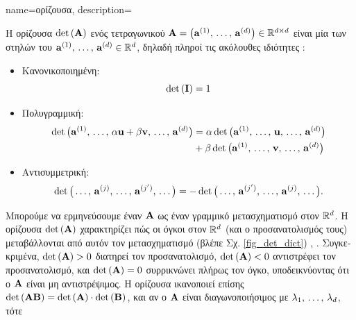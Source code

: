 {name={\foreignlanguage{greek}{ορίζουσα}},
	description={\foreignlanguage{greek}{Η ορίζουσα} $\det\,({\bf A})$ \foreignlanguage{greek}{ενός τετραγωνικού}
		 $\mA =\linebreak \big( \va^{(1)},\,\ldots,\,\va^{(\nrfeatures)} \big) \in \mathbb{R}^{\nrfeatures \times \nrfeatures}$ 
		\foreignlanguage{greek}{είναι μία}  \foreignlanguage{greek}{των στηλών του\linebreak 
		${\bf a}^{(1)},\,\ldots,\,{\bf a}^{(d)} \in \mathbb{R}^{d}$, δηλαδή πληροί τις ακόλουθες ιδιότητες} \cite{DirschmidHansJorg1996TuF}:
		\begin{itemize}
			\item \foreignlanguage{greek}{Κανονικοποιημένη}: $$\det\,(\mathbf{I}) = 1$$ 
			\item \foreignlanguage{greek}{Πολυγραμμική}: \begin{align} \nonumber \det \big({\bf a}^{(1)},\,\ldots,\,\alpha{\bf u}+ \beta {\bf v},\,\ldots,\,{\bf a}^{(d)} \big) & = \alpha\det \big({\bf a}^{(1)},\,\ldots,\,{\bf u},\,\ldots,\,{\bf a}^{(d)} \big) \\ 
			& +\beta\det \big({\bf a}^{(1)},\,\ldots,\,{\bf v},\,\ldots,\,{\bf a}^{(d)} \big) \nonumber
			\end{align}
			\item \foreignlanguage{greek}{Αντισυμμετρική}: $$\det \big(\ldots,\,{\bf a}^{(j)}, \,\ldots, \,{\bf a}^{(j')},\,\ldots \big) = - \det \big(\ldots,\,{\bf a}^{(j')}, \,\ldots, \,{\bf a}^{(j)},\,\ldots \big).$$ 
		\end{itemize}  
		\foreignlanguage{greek}{Μπορούμε να ερμηνεύσουμε έναν}  ${\bf A}$ \foreignlanguage{greek}{ως έναν γραμμικό
		μετασχηματισμό στον $\mathbb{R}^{d}$. Η ορίζουσα $\det\,({\bf A})$ χαρακτηρίζει πώς οι όγκοι στον $\mathbb{R}^d$ 
		(και ο προσανατολισμός τους) μεταβάλλονται από αυτόν τον μετασχηματισμό (βλέπε Σχ.} \ref{fig_det_dict}) \cite{GolubVanLoanBook}, \cite{Strang2007}. 
 		\foreignlanguage{greek}{Συγκεκριμένα, $\det\,({\bf A}) > 0$ διατηρεί τον προσανατολισμό, $\det\,({\bf A}) < 0$ αντιστρέφει τον προσανατολισμό, 
 		και $\det\,({\bf A}) = 0$ συρρικνώνει πλήρως τον όγκο, υποδεικνύοντας ότι ο ${\bf A}$ είναι μη αντιστρέψιμος. 
 		Η ορίζουσα ικανοποιεί επίσης $\det\,({\bf A} {\bf B}) = \det\,({\bf A}) \cdot \det\,({\bf B})$, και αν ο ${\bf A}$ είναι διαγωνοποιήσιμος με}
 		 $\lambda_{1}, \,\ldots, \,\lambda_{d}$, \foreignlanguage{greek}{τότε} 
}}
